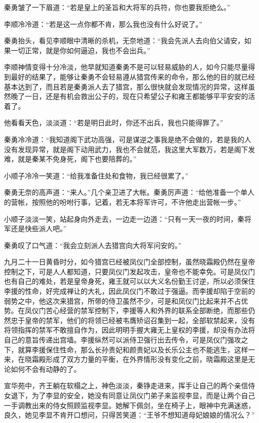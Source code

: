 秦勇皱了一下眉道：“若是皇上的圣旨和大将军的兵符，你也要我拒绝么。”

李顺冷冷道：“若是这一点你都不肯，那么我也没有什么好说了。”

秦勇抬头，看见李顺眼中清晰的杀机，无奈地道：“我会先派人去向伯父请安，如果一切正常，就是你如何逼迫，我也不会出兵。”

李顺神情变得十分冷淡，他早就知道秦勇不是可以轻易威胁的人，如今只能尽量得到最好的结果了，能够让秦勇不会轻易遵从猎宫传来的命令，那么他的目的就已经基本达到了，而且若是秦勇派人去了猎宫，那么很快就会发现情况的异常，这样虽然晚了一日，还是有机会救出公子的，现在只希望公子和雍王都能够平平安安的活着了。

他看看天色，淡淡道：“若是明日此时，你还不出兵，我也只能得罪了。”

秦勇冷冷道：“我知道阁下武功高强，可是谋逆之事我是绝不会做的，若是我的人没有发现异常，就是阁下动用武力，我也不会就范，我这里大军数万，若是阁下发难，就是秦某不免身死，阁下也要陪葬的。”

小顺子冷冷一笑道：“给我准备住处和食物，我已经很累了。”

秦勇无奈的高声道：“来人。”几个亲卫进了大帐。秦勇厉声道：“给他准备一个单人的营帐，按照他的吩咐行事，记着，若无本将军许可，不许他走出营帐一步。”

小顺子淡淡一笑，站起身向外走去，一边走一边道：“只有一天一夜的时间，秦将军还是快些派人吧。”

秦勇叹了口气道：“我会立刻派人去猎宫向大将军问安的。”

九月二十一日黄昏时分，如今猎宫已经被凤仪门全部控制，虽然晓霜殿仍然在皇帝控制之下，可是人人都知道，只要凤仪门发起攻击，皇帝也不能幸免。可是凤仪门也有自己的难处，若是皇帝身死，雍王就可以以大义名份勤王讨逆，所以必须保住李援的性命，好完成禅让的大礼，因此凤仪门不敢过于强逼。而李援却陷于空前的弱势之中，他这次来猎宫，所带的侍卫虽然不少，可是和凤仪门比起来并不占优势。在凤仪门苦心经营的禁军控制下，李援等人和外界的联系全部断绝，而那些仍然忠于皇帝的禁军，他们的将领已经被韦膺矫诏召集到一起，全部软禁起来，没有将领指挥的禁军不敢擅自作为，因此明明手握大雍无上皇权的李援，却没有办法将自己的意旨传递出宫墙。李援纵然可以派侍卫强行出去传令，可是凤仪门强攻之下，就算李援保住性命，那么长孙贵妃和颜贵妃以及长乐公主也不能逃生，这样一来，在晓霜殿形成了双方力量的平衡，在外界情形没有变化之前，晓霜殿这里是无论如何不会有动静的了。

宣华苑中，齐王躺在软榻之上，神色淡淡，秦铮走进来，挥手让自己的两个亲信侍女退下，为了李显的安全，她没有同意让凤仪门弟子来监视李显，而是让两个自己一手调教出来的侍女照顾监视李显。她解下佩剑，坐在椅子上，眼神中充满迷惑，良久，她见李显不肯开口想问，只得苦笑道：“王爷不想知道母妃娘娘的情况么？”

